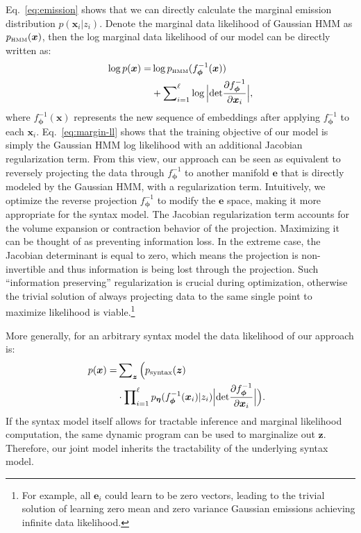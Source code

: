 \documentclass[11pt,a4paper]{article}
\begin{document}
Eq.~\eqref{eq:emission} shows that we can directly calculate the marginal emission distribution $p(\bm{x}_i|z_i)$.
Denote the marginal data likelihood of Gaussian HMM as $p_{\text{{\tiny HMM}}}(\bm{x})$, then the log marginal data likelihood of our model can be directly written as:
\begin{equation}\setlength\abovedisplayskip{6pt}\setlength\belowdisplayskip{6pt}
\label{eq:margin-ll}
\begin{split}
\log p(\bm{x}) = &\log p_{\text{{\tiny HMM}}}(f^{-1}_{\bm{\phi}}(\bm{x})) \\
&+ \sum\nolimits_{i=1}^{\ell}\log \Big|\text{det} \frac{\partial f^{-1}_{\bm{\phi}}}{\partial \bm{x}_i}\Big|,
\end{split}
\end{equation}
where $f^{-1}_{\bm{\phi}}(\bm{x})$ represents the new sequence of embeddings after applying $f_{\bm{\phi}}^{-1}$ to each $\bm{x}_i$. Eq.~\eqref{eq:margin-ll} shows that the training objective of our model is simply the Gaussian HMM log likelihood with an additional Jacobian regularization term. 
From this view, our approach can be seen as equivalent to reversely projecting the data through $f^{-1}_{\bm{\phi}}$ to another manifold $\bm{e}$ that is directly modeled by the Gaussian HMM, with a regularization term. Intuitively, we optimize the reverse projection $f^{-1}_{\bm{\phi}}$ to modify the $\bm{e}$ space, making it more appropriate for the syntax model. The Jacobian regularization term accounts for the volume expansion or contraction behavior of the projection. Maximizing it can be thought of as preventing information loss. In the extreme case, the Jacobian determinant is equal to zero, which means the projection is non-invertible and thus information is being lost through the projection. Such ``information preserving'' regularization is crucial during optimization, otherwise the trivial solution of always projecting data to the same single point to maximize likelihood is viable.\footnote{For example, all $\bm{e}_i$ could learn to be zero vectors, leading to the trivial solution of learning zero mean and zero variance Gaussian emissions achieving infinite data likelihood.}

More generally, for an arbitrary syntax model the data likelihood of our approach is:
\begin{equation}
\label{eq:learn-general}
\begin{split}
\hspace{-3mm}
p(\bm{x}) = &\sum\nolimits_{\bm{z}}\Big(p_{\text{syntax}}(\bm{z}) \\
& \cdot\prod\nolimits_{i=1}^{\ell}p_{\bm{\eta}}(f^{-1}_{\bm{\phi}}(\bm{x}_i) | z_i)\Big|\text{det}\frac{\partial f^{-1}_{\bm{\phi}}}{\partial \bm{x}_i}\Big|\Big).
\end{split}
\end{equation}
If the syntax model itself allows for tractable inference and marginal likelihood computation, the same dynamic program can be used to marginalize out $\bm{z}$. Therefore, our joint model inherits the tractability of the underlying syntax model.
\end{document}
